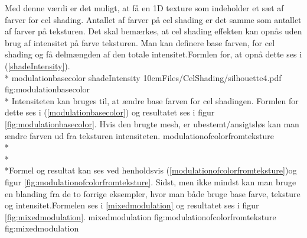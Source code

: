 Med denne værdi er det muligt, at få en 1D texture som indeholder et sæt af farver for cel
shading. Antallet af farver på cel shading er det samme som antallet af farver på teksturen.
Det skal bemærkes, at cel shading effekten kan opnås uden brug af intensitet på farve
teksturen. 
Man kan definere base farven, for cel shading og få delmængden af den totale intensitet.Formlen
for, at opnå dette ses i (\ref{shadeIntensity}).\\* 
{modulationbasecolor} 
 {shadeIntensity} 
 {10em}{Files/CelShading/silhouette4.pdf} {} {fig:modulationbasecolor}
\\*
Intensiteten kan bruges til, at ændre base farven for cel shadingen. Formlen for dette ses i
(\ref{modulationbasecolor}) og resultatet ses i figur \ref{fig:modulationbasecolor}. 
Hvis den brugte mesh, er ubestemt/ansigtsløs kan man ændre farven ud fra teksturen
intensiteten.
{modulationofcolorfromteksture}
\\*\\*\\*Formel og resultat kan ses ved henholdsvis
(\ref{modulationofcolorfromteksture})og figur \ref{fig:modulationofcolorfromteksture}. Sidst,
men ikke mindst kan man bruge en blanding fra de to forrige eksempler, hvor man både bruge base
farve, teksture og intensitet.Formelen ses i \ref{mixedmodulation} og resultatet ses i figur
\ref{fig:mixedmodulation}. {mixedmodulation}
 {fig:modulationofcolorfromteksture}
 {fig:mixedmodulation}
